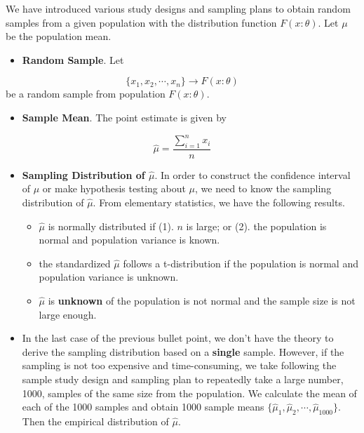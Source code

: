 \documentclass[
]{book}
\providecommand{\tightlist}{%
  \setlength{\itemsep}{0pt}\setlength{\parskip}{0pt}}
\begin{document}
We have introduced various study designs and sampling plans to obtain random samples from a given population with the distribution function \(F(x:\theta)\). Let \(\mu\) be the population mean.

\begin{itemize}
\tightlist
\item
  \textbf{Random Sample}. Let
\end{itemize}

\[\{x_1, x_2, \cdots, x_n\} \to F(x:\theta)\]
be a random sample from population \(F(x:\theta)\).

\begin{itemize}
\tightlist
\item
  \textbf{Sample Mean}. The point estimate is given by
\end{itemize}

\[\hat{\mu} = \frac{\sum_{i=1}^n x_i}{n}\]

\begin{itemize}
\item
  \textbf{Sampling Distribution of \(\hat{\mu}\)}. In order to construct the confidence interval of \(\mu\) or make hypothesis testing about \(\mu\), we need to know the sampling distribution of \(\hat{\mu}\). From elementary statistics, we have the following results.

  \begin{itemize}
  \item
    \(\hat{\mu}\) is normally distributed if (1). \(n\) is large; or (2). the population is normal and population variance is known.
  \item
    the standardized \(\hat{\mu}\) follows a t-distribution if the population is normal and population variance is unknown.
  \item
    \(\hat{\mu}\) is \textbf{unknown} of the population is not normal and the sample size is not large enough.
  \end{itemize}
\item
  In the last case of the previous bullet point, we don't have the theory to derive the sampling distribution based on a \textbf{single} sample. However, if the sampling is not too expensive and time-consuming, we take following the sample study design and sampling plan to repeatedly take a large number, 1000, samples of the same size from the population. We calculate the mean of each of the 1000 samples and obtain 1000 sample means \(\{\hat{\mu}_1, \hat{\mu}_2, \cdots, \hat{\mu}_{1000}\}\). Then the empirical distribution of \(\hat{\mu}\).
\end{itemize}
\end{document}
